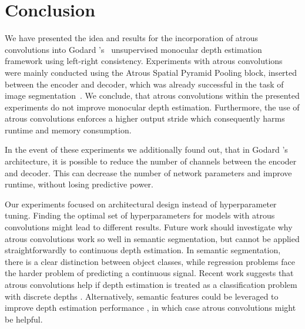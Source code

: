 \section{Conclusion}
We have presented the idea and results for the incorporation of atrous convolutions into Godard \etal's~\cite{Godard_2017_CVPR} unsupervised monocular depth estimation framework using left-right consistency.
Experiments with atrous convolutions were mainly conducted using the Atrous Spatial Pyramid Pooling block, inserted between the encoder and decoder, which was already successful in the task of image segmentation~\cite{chen2018deeplab}.
We conclude, that atrous convolutions within the presented experiments do not improve monocular depth estimation. Furthermore, the use of atrous convolutions enforces a higher output stride which consequently harms runtime and memory consumption.

In the event of these experiments we additionally found out, that in Godard \etal's~\cite{Godard_2017_CVPR} architecture, it is possible to reduce the number of channels between the encoder and decoder. This can decrease the number of network parameters and improve runtime, without losing predictive power.

Our experiments focused on architectural design instead of hyperparameter tuning. Finding the optimal set of hyperparameters for models with atrous convolutions might lead to different results. Future work should investigate why atrous convolutions work so well in semantic segmentation, but cannot be applied straightforwardly to continuous depth estimation. In semantic segmentation, there is a clear distinction between object classes, while regression problems face the harder problem of predicting a continuous signal. Recent work suggests that atrous convolutions help if depth estimation is treated as a classification problem with discrete depths \cite{Fu2018}. Alternatively, semantic features could be leveraged to improve depth estimation performance \cite{Jiao2018}, in which case atrous convolutions might be helpful.
